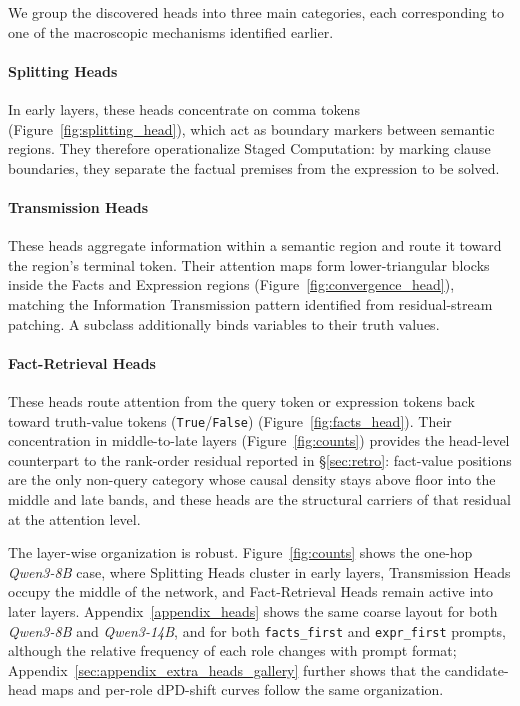 \documentclass[11pt]{article}
\begin{document}
We group the discovered heads into three main categories, each corresponding to one of the macroscopic mechanisms identified earlier.

\paragraph{Splitting Heads} In early layers, these heads concentrate on comma tokens (Figure~\ref{fig:splitting_head}), which act as boundary markers between semantic regions. They therefore operationalize Staged Computation: by marking clause boundaries, they separate the factual premises from the expression to be solved.
\paragraph{Transmission Heads} These heads aggregate information within a semantic region and route it toward the region's terminal token. Their attention maps form lower-triangular blocks inside the Facts and Expression regions (Figure~\ref{fig:convergence_head}), matching the Information Transmission pattern identified from residual-stream patching. A subclass additionally binds variables to their truth values.
\paragraph{Fact-Retrieval Heads} These heads route attention from the query token or expression tokens back toward truth-value tokens (\texttt{True}/\texttt{False}) (Figure~\ref{fig:facts_head}). Their concentration in middle-to-late layers (Figure~\ref{fig:counts}) provides the head-level counterpart to the rank-order residual reported in §\ref{sec:retro}: fact-value positions are the only non-query category whose causal density stays above floor into the middle and late bands, and these heads are the structural carriers of that residual at the attention level.

The layer-wise organization is robust. Figure~\ref{fig:counts} shows the one-hop \textit{Qwen3-8B} case, where Splitting Heads cluster in early layers, Transmission Heads occupy the middle of the network, and Fact-Retrieval Heads remain active into later layers. Appendix~\ref{appendix_heads} shows the same coarse layout for both \textit{Qwen3-8B} and \textit{Qwen3-14B}, and for both \texttt{facts\_first} and \texttt{expr\_first} prompts, although the relative frequency of each role changes with prompt format; Appendix~\ref{sec:appendix_extra_heads_gallery} further shows that the candidate-head maps and per-role dPD-shift curves follow the same organization.
\end{document}
